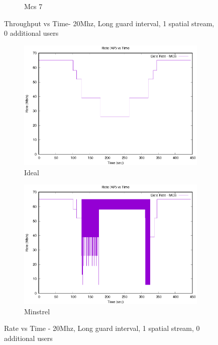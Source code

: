 \documentclass[12]{article}
\begin{document}
\begin{figure}[!htb]
\begin{subfigure}{.4\textwidth}
  \caption{Mcs 7}
  \label{fig:20_7_tt}
\end{subfigure}
\caption{Throughput vs Time- 20Mhz, Long guard interval, 1 spatial stream, 0 additional users}
\label{fig:20_tt}
\end{figure}




\begin{figure}[!htb]
\begin{subfigure}{.5\textwidth}
  \centering
  \includegraphics[width=\linewidth]{"20Mhz_Long_1SS_0AU/Ideal/TimeRate"}
  \caption{Ideal}
  \label{fig:20_id_rt}
\end{subfigure}%
\begin{subfigure}{.5\textwidth}
  \includegraphics[width=\linewidth]{"20Mhz_Long_1SS_0AU/MinstrelHt/TimeRate"}
  \caption{Minstrel}
  \label{fig:20_mi_rt}
\end{subfigure}%
\caption{Rate vs Time - 20Mhz, Long guard interval, 1 spatial stream, 0 additional users}
\label{fig:20_rt}
\end{figure}
\end{document}
